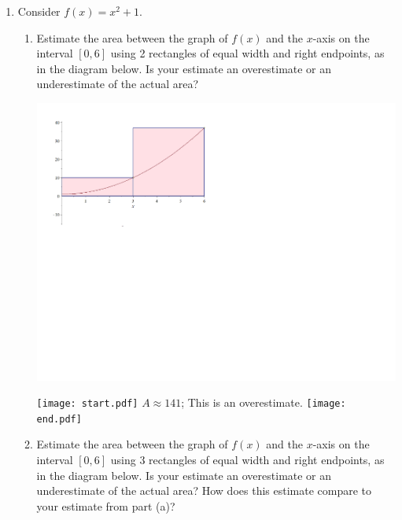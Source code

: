 \documentclass[12pt]{article}
\begin{document}
\begin{enumerate}
\item Consider $f(x)=x^2+1$.

\begin{enumerate}

\item Estimate the area between the graph of $f(x)$ and the $x$-axis on the interval $[0,6]$ using 2 rectangles of equal width and right endpoints, as in the diagram below.  Is your estimate an overestimate or an underestimate of the actual area?

\begin{center}
\includegraphics[scale=0.5]{2rect.pdf}
\end{center}

\texttt{[image: start.pdf]}
{{$A\approx 141$; This is an overestimate.}}
\texttt{[image: end.pdf]}


\item Estimate the area between the graph of $f(x)$ and the $x$-axis on the interval $[0,6]$ using 3 rectangles of equal width and right endpoints, as in the diagram below.  Is your estimate an overestimate or an underestimate of the actual area?  How does this estimate compare to your estimate from part (a)?


\end{enumerate}
\end{enumerate}
\end{document}
